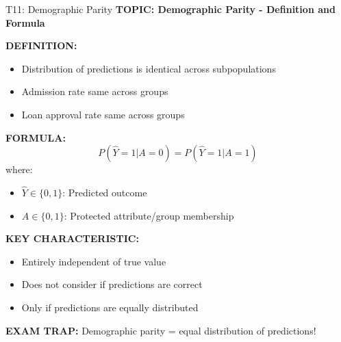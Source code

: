 \documentclass[8pt]{beamer}
\begin{document}
	\begin{frame}{T11: Demographic Parity}
		\fontsize{6.5}{7.5}\selectfont
		\textbf{TOPIC: Demographic Parity - Definition and Formula}
		
		\vspace{0.1cm}
		\textbf{DEFINITION:}
		\begin{itemize}
			\item Distribution of predictions is identical across subpopulations
			\item Admission rate same across groups
			\item Loan approval rate same across groups
		\end{itemize}
		
		\vspace{0.1cm}
		\textbf{FORMULA:}
		\[
		P(\hat{Y}=1|A=0) = P(\hat{Y}=1|A=1)
		\]
		where:
		\begin{itemize}
			\item $\hat{Y} \in \{0,1\}$: Predicted outcome
			\item $A \in \{0,1\}$: Protected attribute/group membership
		\end{itemize}
		
		\vspace{0.1cm}
		\textbf{KEY CHARACTERISTIC:}
		\begin{itemize}
			\item Entirely independent of true value
			\item Does not consider if predictions are correct
			\item Only if predictions are equally distributed
		\end{itemize}
		
		\textcolor{myred}{\textbf{EXAM TRAP:}} Demographic parity = \textcolor{myblue}{equal distribution of predictions}!
	\end{frame}
	
\end{document}
